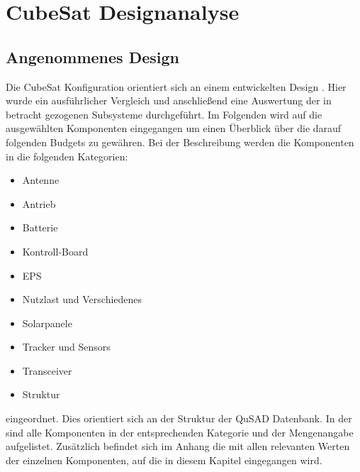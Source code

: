 		\section{CubeSat Designanalyse}
				
				\subsection{Angenommenes Design}
				\label{cap:AngenommenesDesign}
				Die CubeSat Konfiguration orientiert sich an einem entwickelten Design \cite{Lettau.}. Hier wurde ein ausführlicher Vergleich und anschließend eine Auswertung der in betracht gezogenen Subsysteme durchgeführt. Im Folgenden wird auf die ausgewählten Komponenten eingegangen um einen Überblick über die darauf folgenden Budgets zu gewähren. Bei der Beschreibung werden die Komponenten in die folgenden Kategorien: 
				\begin{itemize}
					\item Antenne
					\item Antrieb
					\item Batterie
					\item Kontroll-Board
					\item EPS
					\item Nutzlast und Verschiedenes 
					\item Solarpanele
					\item Tracker und Sensors
					\item Transceiver
					\item Struktur
				\end{itemize}
eingeordnet. Dies orientiert sich an der Struktur der QuSAD Datenbank. In der  sind alle Komponenten in der entsprechenden Kategorie und der Mengenangabe aufgelistet. Zusätzlich befindet sich im Anhang die  mit allen relevanten Werten der einzelnen Komponenten, auf die in diesem Kapitel eingegangen wird.
